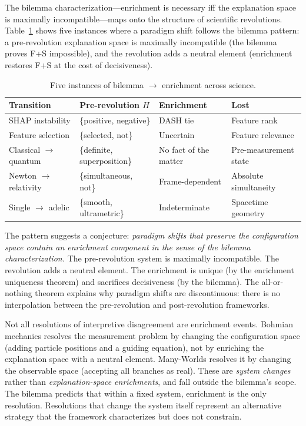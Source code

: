 \documentclass[11pt,a4paper]{article}
\begin{document}
The bilemma characterization---enrichment is necessary iff the explanation
space is maximally incompatible---maps onto the structure of scientific
revolutions. Table~\ref{tab:revolutions} shows five instances where a
paradigm shift follows the bilemma pattern: a pre-revolution explanation
space is maximally incompatible (the bilemma proves F+S impossible), and the
revolution adds a neutral element (enrichment restores F+S at the cost
of decisiveness).

\begin{table}[h]
\centering
\small
\caption{Five instances of bilemma $\to$ enrichment across science.}
\label{tab:revolutions}
\begin{tabular}{@{}llll@{}}
\toprule
Transition & Pre-revolution $H$ & Enrichment & Lost \\
\midrule
SHAP instability & \{positive, negative\} & DASH tie & Feature rank \\
Feature selection & \{selected, not\} & Uncertain & Feature relevance \\
Classical $\to$ quantum & \{definite, superposition\} & No fact of the matter & Pre-measurement state \\
Newton $\to$ relativity & \{simultaneous, not\} & Frame-dependent & Absolute simultaneity \\
Single $\to$ adelic & \{smooth, ultrametric\} & Indeterminate & Spacetime geometry \\
\bottomrule
\end{tabular}
\end{table}

The pattern suggests a conjecture: \emph{paradigm shifts that preserve the
configuration space contain an enrichment component in the sense of the
bilemma characterization.}
The pre-revolution system is maximally incompatible. The revolution adds a
neutral element. The enrichment is unique (by the enrichment uniqueness
theorem) and sacrifices decisiveness (by the bilemma). The all-or-nothing
theorem explains why paradigm shifts are discontinuous: there is no
interpolation between the pre-revolution and post-revolution frameworks.

Not all resolutions of interpretive disagreement are enrichment events. Bohmian mechanics resolves the measurement problem by changing the configuration space (adding particle positions and a guiding equation), not by enriching the explanation space with a neutral element. Many-Worlds resolves it by changing the observable space (accepting all branches as real). These are \emph{system changes} rather than \emph{explanation-space enrichments}, and fall outside the bilemma's scope. The bilemma predicts that within a fixed system, enrichment is the only resolution. Resolutions that change the system itself represent an alternative strategy that the framework characterizes but does not constrain.
\end{document}
